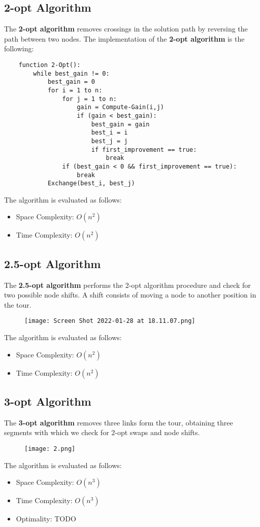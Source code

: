 \documentclass{article}
\begin{document}
\subsection{2-opt Algorithm}
The \textbf{2-opt algorithm} removes crossings in the solution path by reversing the path between two nodes. The implementation of the \textbf{2-opt algorithm} is the following:
\begin{verbatim}
    function 2-Opt():
        while best_gain != 0:
            best_gain = 0
            for i = 1 to n:
                for j = 1 to n:
                    gain = Compute-Gain(i,j)
                    if (gain < best_gain):
                        best_gain = gain
                        best_i = i
                        best_j = j
                        if first_improvement == true:
                            break
                if (best_gain < 0 && first_improvement == true):
                    break
            Exchange(best_i, best_j)        
\end{verbatim}
The algorithm is evaluated as follows:
\begin{itemize}
    \item Space Complexity: $O(n^2)$
    \item Time Complexity: $O(n^2)$
\end{itemize}
\subsection{2.5-opt Algorithm}
The \textbf{2.5-opt algorithm} performs the 2-opt algorithm procedure and check for two possible node shifts. A shift consists of moving a node to another position in the tour.
\begin{figure}[H]
    \centering
    \texttt{[image: Screen Shot 2022-01-28 at 18.11.07.png]}
\end{figure}
The algorithm is evaluated as follows:
\begin{itemize}
    \item Space Complexity: $O(n^2)$
    \item Time Complexity: $O(n^2)$
\end{itemize}
\newpage
\subsection{3-opt Algorithm}
The \textbf{3-opt algorithm} removes three links form the tour, obtaining three segments with which we check for 2-opt swaps and node shifts.
\begin{figure}[H]
    \centering
    \texttt{[image: 2.png]}
\end{figure}
The algorithm is evaluated as follows:
\begin{itemize}
    \item Space Complexity: $O(n^3)$
    \item Time Complexity: $O(n^3)$
    \item Optimality: TODO
\end{itemize}
\end{document}
